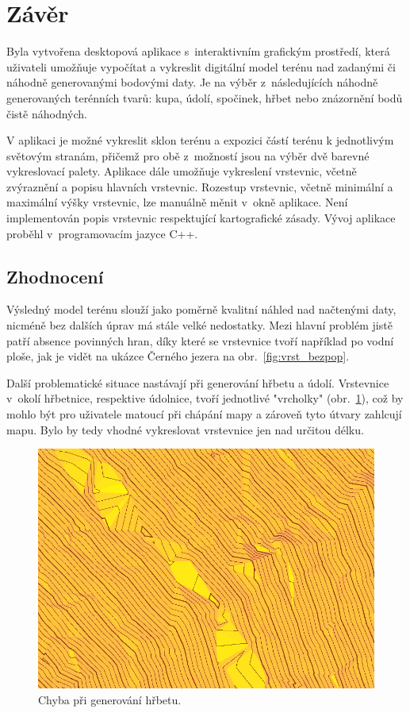 \documentclass[a4paper, 12pt, oneside, titlepage]{article} %
\begin{document}
\section{Závěr}
Byla vytvořena desktopová aplikace s~interaktivním grafickým prostředí, která uživateli umožňuje vypočítat a vykreslit digitální model terénu nad zadanými či náhodně generovanými bodovými daty. Je na výběr z~následujících náhodně generovaných terénních tvarů: kupa, údolí, spočinek, hřbet nebo znázornění bodů čistě náhodných. 

V aplikaci je možné vykreslit sklon terénu a expozici částí terénu k jednotlivým světovým stranám, přičemž pro obě z~možností jsou na výběr dvě barevné vykreslovací palety. Aplikace dále umožňuje vykreslení vrstevnic, včetně zvýraznění a popisu hlavních vrstevnic. Rozestup vrstevnic, včetně minimální a maximální výšky vrstevnic, lze manuálně měnit v~okně aplikace. Není implementován popis vrstevnic respektující kartografické zásady. Vývoj aplikace proběhl v~programovacím jazyce C++. 

\subsection{Zhodnocení}
Výsledný model terénu slouží jako poměrně kvalitní náhled nad načtenými daty, nicméně bez dalších úprav má stále velké nedostatky. Mezi hlavní problém jistě patří absence povinných hran, díky které se vrstevnice tvoří například po vodní ploše, jak je vidět na ukázce Černého jezera na obr.~\ref{fig:vrst_bezpop}. 

Další problematické situace nastávají při generování hřbetu a údolí. Vrstevnice v~okolí hřbetnice, respektive údolnice, tvoří jednotlivé "vrcholky" (obr.~\ref{fig:chyba_hrbet}), což by mohlo být pro uživatele matoucí při chápání mapy a zároveň tyto útvary zahlcují mapu. Bylo by tedy vhodné vykreslovat vrstevnice jen nad určitou délku.

 \begin{figure}[!htb]
	\centering
	\includegraphics[scale=0.8]{obrazky/chyba_hrbet.png} 
	\caption{Chyba při generování hřbetu.
	}
	\label{fig:chyba_hrbet}
\end{figure} 
\FloatBarrier
\end{document}
